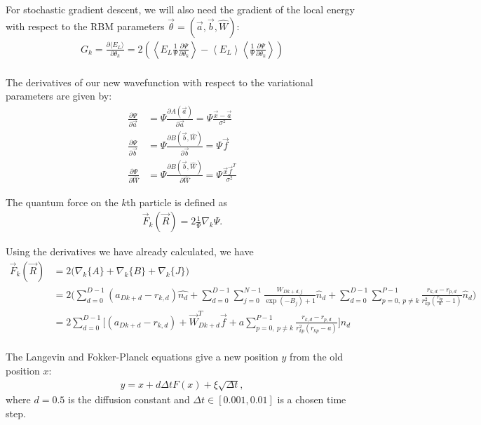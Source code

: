 \documentclass[12pt]{article}
\begin{document}
\noindent For stochastic gradient descent, we will also need the gradient of the local energy with respect to the RBM parameters $\vec{\theta}=(\vec{a},\vec{b},\hat{W})$:
\begin{align*}
G_k = \frac{\partial \langle E_L \rangle}{\partial \theta_k} = 2 \left( \left\langle E_L \frac{1}{\Psi} \frac{\partial \Psi}{\partial \theta_k} \right\rangle - \left\langle E_L \right\rangle \left\langle \frac{1}{\Psi} \frac{\partial \Psi}{\partial \theta_k} \right\rangle \right)\\
\end{align*}



\noindent The derivatives of our new wavefunction with respect to the variational parameters are given by:
\begin{align*}
\frac{\partial \Psi}{\partial \vec{a}} &= \Psi \frac{\partial A(\vec{a})}{\partial \vec{a}} = \Psi \frac{\vec{x}-\vec{a}}{\sigma^2}\\
\frac{\partial \Psi}{\partial \vec{b}} &= \Psi \frac{\partial B(\vec{b},\hat{W})}{\partial \vec{b}} = \Psi \vec{f} \\
\frac{\partial \Psi}{\partial \hat{W}} &= \Psi \frac{\partial B(\vec{b},\hat{W})}{\partial \hat{W}}
= \Psi \frac{\vec{x} \vec{f}^T}{\sigma^2}
\end{align*}


\noindent The quantum force on the $k$th particle is defined as 
\begin{align}
\vec{F}_k(\vec{R}) = 2 \frac{1}{\Psi} \nabla_k \Psi.
\end{align}

\noindent Using the derivatives we have already calculated, we have
\begin{align*}
\vec{F}_k(\vec{R}) &= 2 \Big( \nabla_k \{ A \} + \nabla_k \{ B \} +\nabla_k \{ J \} \Big)\\
&= 2 \bigg( \sum_{d=0}^{D-1} (a_{Dk+d} -r_{k,d} ) \hat{n_{d}}  
 + \sum_{d=0}^{D-1} \sum_{j=0}^{N-1}  \frac{W_{Dk+d,j}}{\exp(-B_j)+1}   \hat{n}_d  
 + \sum_{d=0}^{D-1} \sum_{p=0, \ p\neq k}^{P-1} \frac{r_{k,d}-r_{p,d}}{r_{kp}^2 \left( \frac{r_{kp}}{a} -1 \right)} \hat{n}_d
 \bigg)\\
 &= 2 \sum_{d=0}^{D-1} \bigg[  (a_{Dk+d} -r_{k,d} ) 
 + \vec{W}_{Dk+d}^T\vec{f}   
 +  a \sum_{p=0, \ p\neq k}^{P-1} \frac{r_{k,d}-r_{p,d}}{r_{kp}^2 \left( r_{kp}-a \right)} 
 \bigg]\hat{n}_d\\
\end{align*}

\noindent The Langevin and Fokker-Planck equations give a new position $y$ from the old position $x$:
\begin{align}
y = x + d\Delta tF(x) + \xi \sqrt{\Delta t},
\end{align}
where $d=0.5$ is the diffusion constant and $\Delta t \in [0.001,0.01]$ is a chosen time step. \\
\end{document}
